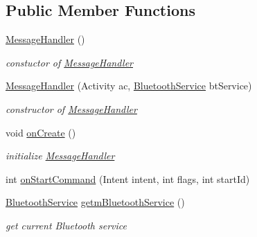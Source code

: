 \subsection*{Public Member Functions}
\begin{DoxyCompactItemize}
\item 
\mbox{\hyperlink{classhi_1_1world_1_1hello_1_1myapplication_1_1_message_handler_a3f340dbd546df332f2e4872cdbe8157a}{Message\+Handler}} ()
\begin{DoxyCompactList}\small\item\em constuctor of \mbox{\hyperlink{classhi_1_1world_1_1hello_1_1myapplication_1_1_message_handler}{Message\+Handler}} \end{DoxyCompactList}\item 
\mbox{\hyperlink{classhi_1_1world_1_1hello_1_1myapplication_1_1_message_handler_ae2003b499a79c11ba049ca15df235644}{Message\+Handler}} (Activity ac, \mbox{\hyperlink{classhi_1_1world_1_1hello_1_1myapplication_1_1_bluetooth_service}{Bluetooth\+Service}} bt\+Service)
\begin{DoxyCompactList}\small\item\em constructor of \mbox{\hyperlink{classhi_1_1world_1_1hello_1_1myapplication_1_1_message_handler}{Message\+Handler}} \end{DoxyCompactList}\item 
void \mbox{\hyperlink{classhi_1_1world_1_1hello_1_1myapplication_1_1_message_handler_ae550e2211e38fe8e9aa9ba0c0578b9fc}{on\+Create}} ()
\begin{DoxyCompactList}\small\item\em initialize \mbox{\hyperlink{classhi_1_1world_1_1hello_1_1myapplication_1_1_message_handler}{Message\+Handler}} \end{DoxyCompactList}\item 
int \mbox{\hyperlink{classhi_1_1world_1_1hello_1_1myapplication_1_1_message_handler_a4678a911364d3b6d40e107df8dc28488}{on\+Start\+Command}} (Intent intent, int flags, int start\+Id)
\item 
\mbox{\hyperlink{classhi_1_1world_1_1hello_1_1myapplication_1_1_bluetooth_service}{Bluetooth\+Service}} \mbox{\hyperlink{classhi_1_1world_1_1hello_1_1myapplication_1_1_message_handler_abd52d22e358f8b53d0f288e96fe4b64b}{getm\+Bluetooth\+Service}} ()
\begin{DoxyCompactList}\small\item\em get current Bluetooth service \end{DoxyCompactList}\item 

\end{DoxyCompactItemize}
